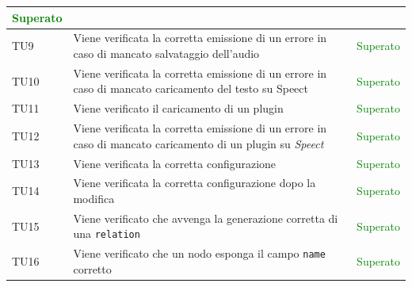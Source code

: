 \documentclass[openany,12pt,a4paper]{report}
\begin{document}
\begin{longtable}[c]{| p{2.5cm} |p{8cm} | p{2.5cm} |}
	\newline \textcolor{green}{Superato}
	\\[1em]
	\hline
	\newline TU9&
	\newline Viene verificata la corretta emissione di un errore in caso di mancato salvataggio dell'audio&
	\newline \textcolor{green}{Superato}
	\\[1em]
	\hline
	\newline TU10&
	\newline Viene verificata la corretta emissione di un errore in caso di mancato caricamento del testo su Speect&
	\newline \textcolor{green}{Superato}
	\\[1em]
	\hline
	\newline TU11&
	\newline Viene verificato il caricamento di un plugin&
	\newline \textcolor{green}{Superato}
	\\[1em]
	\hline
	\newline TU12&
	\newline Viene verificata la corretta emissione di un errore in caso di mancato caricamento di un plugin su \textit{Speect}&
	\newline \textcolor{green}{Superato}
	\\[1em]
	\hline
	\newline TU13&
	\newline Viene verificata la corretta configurazione&
	\newline \textcolor{green}{Superato}
	\\[1em]
	\hline
	\newline TU14&
	\newline Viene verificata la corretta configurazione dopo la modifica&
	\newline \textcolor{green}{Superato}
	\\[1em]
	\hline
	\newline TU15&
	\newline Viene verificato che avvenga la generazione corretta di una \verb|relation|&
	\newline \textcolor{green}{Superato}
	\\[1em]
	\hline
	\newline TU16&
	\newline Viene verificato che un nodo esponga il campo \verb|name| corretto&
	\newline \textcolor{green}{Superato}

\end{longtable}
\end{document}
